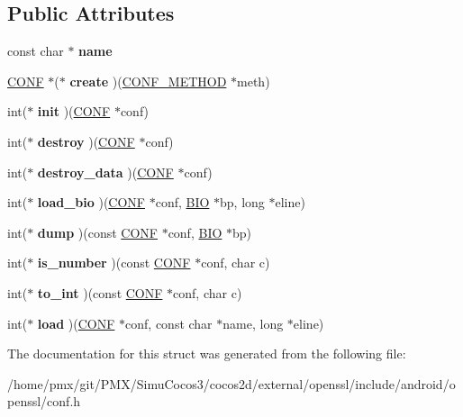 \subsection*{Public Attributes}
\begin{DoxyCompactItemize}
\item 
\mbox{\label{structconf__method__st_aef2e1cc2815140c6d37ff7846efbcc68}} 
const char $\ast$ {\bfseries name}
\item 
\mbox{\label{structconf__method__st_a0057101cf71e5204d3cba0a186eb22df}} 
\hyperlink{structconf__st}{C\+O\+NF} $\ast$($\ast$ {\bfseries create} )(\hyperlink{structconf__method__st}{C\+O\+N\+F\+\_\+\+M\+E\+T\+H\+OD} $\ast$meth)
\item 
\mbox{\label{structconf__method__st_aeb2a9f5327088d8b70ce73cb05c3a2ab}} 
int($\ast$ {\bfseries init} )(\hyperlink{structconf__st}{C\+O\+NF} $\ast$conf)
\item 
\mbox{\label{structconf__method__st_aca66b242d2a5cb5fb6f0c1aef8709e58}} 
int($\ast$ {\bfseries destroy} )(\hyperlink{structconf__st}{C\+O\+NF} $\ast$conf)
\item 
\mbox{\label{structconf__method__st_a9db8bafd8ea4da7a76401223800770f2}} 
int($\ast$ {\bfseries destroy\+\_\+data} )(\hyperlink{structconf__st}{C\+O\+NF} $\ast$conf)
\item 
\mbox{\label{structconf__method__st_aa919d761f6688297495533a5c0062f3c}} 
int($\ast$ {\bfseries load\+\_\+bio} )(\hyperlink{structconf__st}{C\+O\+NF} $\ast$conf, \hyperlink{structbio__st}{B\+IO} $\ast$bp, long $\ast$eline)
\item 
\mbox{\label{structconf__method__st_aeb5ecd4799e355e000cc4156f24a4fb1}} 
int($\ast$ {\bfseries dump} )(const \hyperlink{structconf__st}{C\+O\+NF} $\ast$conf, \hyperlink{structbio__st}{B\+IO} $\ast$bp)
\item 
\mbox{\label{structconf__method__st_a178652c603aa6ca7a7730fbd5ec6284a}} 
int($\ast$ {\bfseries is\+\_\+number} )(const \hyperlink{structconf__st}{C\+O\+NF} $\ast$conf, char c)
\item 
\mbox{\label{structconf__method__st_a1605e3fe6bfc55f1fa708247cdf6282e}} 
int($\ast$ {\bfseries to\+\_\+int} )(const \hyperlink{structconf__st}{C\+O\+NF} $\ast$conf, char c)
\item 
\mbox{\label{structconf__method__st_a4e96ed5168d7da3349c3baec86d1e8bb}} 
int($\ast$ {\bfseries load} )(\hyperlink{structconf__st}{C\+O\+NF} $\ast$conf, const char $\ast$name, long $\ast$eline)
\end{DoxyCompactItemize}


The documentation for this struct was generated from the following file\+:\begin{DoxyCompactItemize}
\item 
/home/pmx/git/\+P\+M\+X/\+Simu\+Cocos3/cocos2d/external/openssl/include/android/openssl/conf.\+h\end{DoxyCompactItemize}
